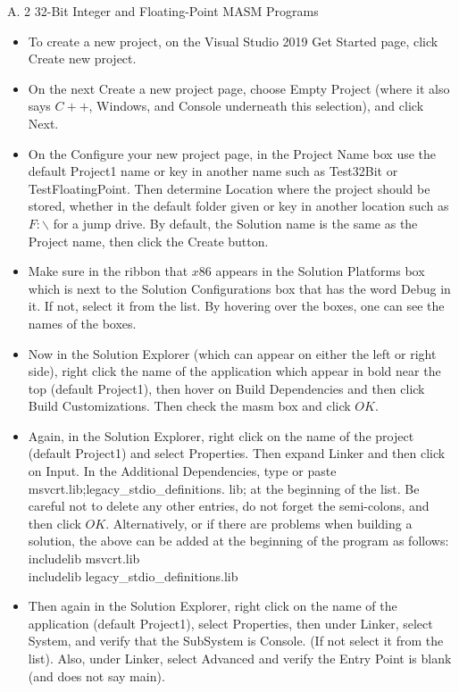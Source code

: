 \documentclass[10pt]{book}
\begin{document}
A. 2 32-Bit Integer and Floating-Point MASM Programs
\begin{itemize}
  \item To create a new project, on the Visual Studio 2019 Get Started page, click Create new project.
  \item On the next Create a new project page, choose Empty Project (where it also says $C++$, Windows, and Console underneath this selection), and click Next.
  \item On the Configure your new project page, in the Project Name box use the default Project1 name or key in another name such as Test32Bit or TestFloatingPoint. Then determine Location where the project should be stored, whether in the default folder given or key in another location such as $F: \backslash$ for a jump drive. By default, the Solution name is the same as the Project name, then click the Create button.
  \item Make sure in the ribbon that $x 86$ appears in the Solution Platforms box which is next to the Solution Configurations box that has the word Debug in it. If not, select it from the list. By hovering over the boxes, one can see the names of the boxes.
  \item Now in the Solution Explorer (which can appear on either the left or right side), right click the name of the application which appear in bold near the top (default Project1), then hover on Build Dependencies and then click Build Customizations. Then check the masm box and click $O K$.
  \item Again, in the Solution Explorer, right click on the name of the project (default Project1) and select Properties. Then expand Linker and then click on Input. In the Additional Dependencies, type or paste msvcrt.lib;legacy\_stdio\_definitions. lib; at the beginning of the list. Be careful not to delete any other entries, do not forget the semi-colons, and then click $O K$. Alternatively, or if there are problems when building a solution, the above can be added at the beginning of the program as follows:\\
includelib msvcrt.lib\\
includelib legacy\_stdio\_definitions.lib
  \item Then again in the Solution Explorer, right click on the name of the application (default Project1), select Properties, then under Linker, select System, and verify that the SubSystem is Console. (If not select it from the list). Also, under Linker, select Advanced and verify the Entry Point is blank (and does not say main).

\end{itemize}
\end{document}

